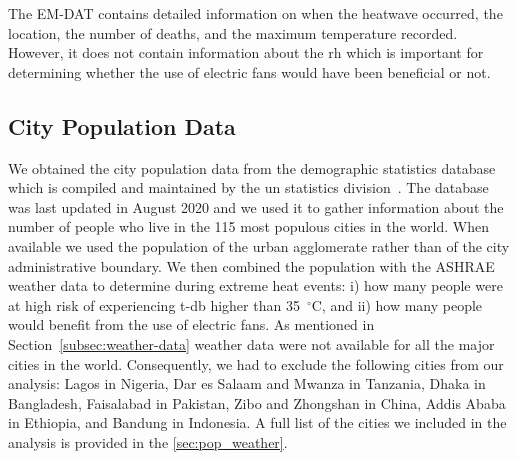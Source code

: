 The EM-DAT contains detailed information on when the heatwave occurred, the location, the number of deaths, and the maximum temperature recorded.
However, it does not contain information about the \ac{rh} which is important for determining whether the use of electric fans would have been beneficial or not.

\subsection{City Population Data}\label{subsec:population-data}

We obtained the city population data from the demographic statistics database which is compiled and maintained by the \ac{un} statistics division~\cite{UNdatare88:online}.
The database was last updated in August 2020 and we used it to gather information about the number of people who live in the 115 most populous cities in the world.
When available we used the population of the urban agglomerate rather than of the city administrative boundary.
We then combined the population with the ASHRAE weather data to determine during extreme heat events: i) how many people were at high risk of experiencing \ac{t-db} higher than 35~$^{\circ}$C\@, and ii) how many people would benefit from the use of electric fans.
As mentioned in Section~\ref{subsec:weather-data} weather data were not available for all the major cities in the world.
Consequently, we had to exclude the following cities from our analysis: Lagos in Nigeria, Dar es Salaam and Mwanza in Tanzania, Dhaka in Bangladesh, Faisalabad in Pakistan, Zibo and Zhongshan in China, Addis Ababa in Ethiopia, and Bandung in Indonesia.
A full list of the cities we included in the analysis is provided in the \ref{sec:pop_weather}.